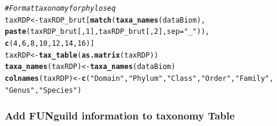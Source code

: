 \documentclass[12pt]{article}\usepackage[]{graphicx}\usepackage[]{color}
\makeatletter
\newcommand{\hlnum}[1]{\textcolor[rgb]{0.686,0.059,0.569}{#1}}%
\newcommand{\hlstr}[1]{\textcolor[rgb]{0.192,0.494,0.8}{#1}}%
\newcommand{\hlcom}[1]{\textcolor[rgb]{0.678,0.584,0.686}{\textit{#1}}}%
\newcommand{\hlstd}[1]{\textcolor[rgb]{0.345,0.345,0.345}{#1}}%
\newcommand{\hlkwb}[1]{\textcolor[rgb]{0.69,0.353,0.396}{#1}}%
\newcommand{\hlkwc}[1]{\textcolor[rgb]{0.333,0.667,0.333}{#1}}%
\newcommand{\hlkwd}[1]{\textcolor[rgb]{0.737,0.353,0.396}{\textbf{#1}}}%
\newenvironment{kframe}{%
 \def\at@end@of@kframe{}%
 \ifinner\ifhmode%
  \def\at@end@of@kframe{\end{minipage}}%
  \begin{minipage}{\columnwidth}%
 \fi\fi%
 \def\FrameCommand##1{\hskip\@totalleftmargin \hskip-\fboxsep
 \colorbox{shadecolor}{##1}\hskip-\fboxsep
     \hskip-\linewidth \hskip-\@totalleftmargin \hskip\columnwidth}%
 \MakeFramed {\advance\hsize-\width
   \@totalleftmargin\z@ \linewidth\hsize
   \@setminipage}}%
 {\par\unskip\endMakeFramed%
 \at@end@of@kframe}
\newenvironment{knitrout}{}{} %
\numberwithin{figure}{section}
\makeatother
\begin{document}
\begin{knitrout}\small
{}\color{fgcolor}\begin{kframe}
\begin{alltt}
\hlcom{# Format taxonomy for phyloseq}
\hlstd{taxRDP} \hlkwb{<-} \hlstd{taxRDP_brut[}\hlkwd{match}\hlstd{(}\hlkwd{taxa_names}\hlstd{(dataBiom),}
                             \hlkwd{paste}\hlstd{(taxRDP_brut[,} \hlnum{1}\hlstd{], taxRDP_brut[,} \hlnum{2}\hlstd{],} \hlkwc{sep} \hlstd{=} \hlstr{"_"}\hlstd{)),}
                       \hlkwd{c}\hlstd{(}\hlnum{4}\hlstd{,} \hlnum{6}\hlstd{,} \hlnum{8}\hlstd{,} \hlnum{10}\hlstd{,} \hlnum{12}\hlstd{,} \hlnum{14}\hlstd{,} \hlnum{16}\hlstd{)]}
\hlstd{taxRDP} \hlkwb{<-} \hlkwd{tax_table}\hlstd{(}\hlkwd{as.matrix}\hlstd{(taxRDP))}
\hlkwd{taxa_names}\hlstd{(taxRDP)} \hlkwb{<-} \hlkwd{taxa_names}\hlstd{(dataBiom)}
\hlkwd{colnames}\hlstd{(taxRDP)} \hlkwb{<-} \hlkwd{c}\hlstd{(}\hlstr{"Domain"}\hlstd{,} \hlstr{"Phylum"}\hlstd{,} \hlstr{"Class"}\hlstd{,} \hlstr{"Order"}\hlstd{,} \hlstr{"Family"}\hlstd{,}
                      \hlstr{"Genus"}\hlstd{,} \hlstr{"Species"}\hlstd{)}
\end{alltt}
\end{kframe}
\end{knitrout}


\subsubsection{Add FUNguild information to taxonomy Table}
\end{document}

